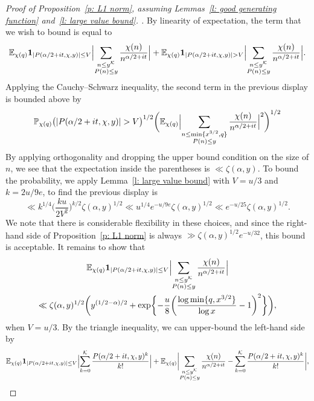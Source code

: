 \documentclass[a4paper,12pt,reqno]{amsart}
\newcommand{\E}{\mathbb{E}}
\newcommand{\p}{\mathbb{P}}
\begin{document}
\begin{proof}[Proof of Proposition~\ref{p: L1 norm}, assuming Lemmas~\ref{l: good generating function} and~\ref{l: large value bound}. ]
By linearity of expectation, the term that we wish to bound is equal to
\[
\E_{\chi (q)} \mathbf{1}_{|P (\alpha / 2 + it, \chi, y)| \leq V} \Bigl| \sum_{\substack{n \leq y^{\mathcal{K}} \\ P(n) \leq y}} \frac{\chi(n)}{n^{\alpha /2+it}} \Bigr| + \E_{\chi (q)} \mathbf{1}_{|P (\alpha / 2 + it, \chi, y)| > V} \Bigl| \sum_{\substack{n \leq y^{\mathcal{K}} \\ P(n) \leq y}} \frac{\chi(n)}{n^{\alpha /2+it}} \Bigr| .
\]
Applying the Cauchy--Schwarz inequality, the second term in the previous display is bounded above by
\[
\p_{\chi (q)} \bigl( |P (\alpha / 2 + it, \chi, y)| > V \bigr)^{1/2} \biggl( \E_{\chi (q)} \Bigl| \sum_{\substack{n \leq \min \{x^{3/2}, q\} \\ P(n) \leq y}} \frac{\chi(n)}{n^{\alpha / 2 + it}} \Bigr|^2 \biggr)^{1/2}
\]
By applying orthogonality and dropping the upper bound condition on the size of $n$, we see that the expectation inside the parentheses is $\ll \zeta(\alpha, y)$. To bound the probability, we apply Lemma~\ref{l: large value bound} with $V = u/3$ and $k = 2 u / 9e$, to find the previous display is
\[
\ll k^{1/4} \biggl( \frac{k u}{2 V^2} \biggr)^{k/2} \zeta(\alpha, y)^{1/2} \ll u^{1/4} e^{-u/9e} \zeta(\alpha, y)^{1/2} \ll e^{-u/25} \zeta(\alpha, y)^{1/2} .
\]
We note that there is considerable flexibility in these choices, and since the right-hand side of Proposition~\ref{p: L1 norm} is always $\gg \zeta (\alpha, y)^{1/2} e^{-u/32}$, this bound is acceptable. It remains to show that
\begin{multline*}
\E_{\chi (q)} \mathbf{1}_{|P (\alpha/2 + it, \chi, y)| \leq V} \Bigl| \sum_{\substack{n \leq y^{\mathcal{K}} \\ P(n) \leq y}} \frac{\chi(n)}{n^{\alpha / 2 + it}} \Bigr| \\ 
\ll \zeta (\alpha, y)^{1/2} \biggl(y^{(1/2 - \alpha)/2} + \exp \biggl\{ - \frac{u}{8} \biggl( \frac{\log \min\{ q, x^{3/2} \}}{\log x} -1 \biggr)^2 \biggr\} \biggr),
\end{multline*}
when $V = u/3$. By the triangle inequality, we can upper-bound the left-hand side by
\[
\E_{\chi(q)} \mathbf{1}_{|P (\alpha/2 + it, \chi, y)| \leq V} \Bigl| \sum_{k=0}^{\mathcal{K}} \frac{P (\alpha/2 + it, \chi, y)^k}{k!} \Bigr| + \E_{\chi (q)} \biggl| \sum_{\substack{n \leq y^{\mathcal{K}} \\ P(n) \leq y}} \frac{\chi(n)}{n^{\alpha / 2 + it}} - \sum_{k = 0}^{\mathcal{K}} \frac{P (\alpha / 2 + it, \chi, y)^{k}}{k!} \biggr|,
\]
\end{proof}
\end{document}
